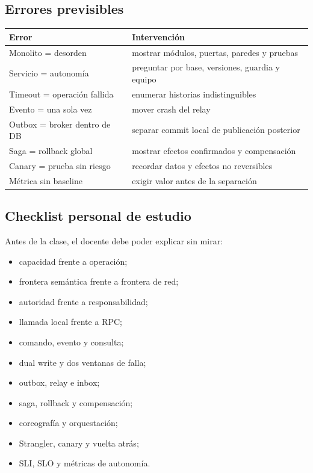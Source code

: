 \documentclass[variant=docente,cover=institutional,mode=screen]{ua-engineering-v6-article}
\begin{document}
\subsection{Errores previsibles}
\begin{center}
\begin{tabular}{p{}p{}}
\toprule
\textbf{Error} & \textbf{Intervención} \\
\midrule
Monolito = desorden & mostrar módulos, puertas, paredes y pruebas \\
Servicio = autonomía & preguntar por base, versiones, guardia y equipo \\
Timeout = operación fallida & enumerar historias indistinguibles \\
Evento = una sola vez & mover crash del relay \\
Outbox = broker dentro de DB & separar commit local de publicación posterior \\
Saga = rollback global & mostrar efectos confirmados y compensación \\
Canary = prueba sin riesgo & recordar datos y efectos no reversibles \\
Métrica sin baseline & exigir valor antes de la separación \\
\bottomrule
\end{tabular}
\end{center}

\subsection{Checklist personal de estudio}
Antes de la clase, el docente debe poder explicar sin mirar:
\begin{itemize}
\item capacidad frente a operación;
\item frontera semántica frente a frontera de red;
\item autoridad frente a responsabilidad;
\item llamada local frente a RPC;
\item comando, evento y consulta;
\item dual write y dos ventanas de falla;
\item outbox, relay e inbox;
\item saga, rollback y compensación;
\item coreografía y orquestación;
\item Strangler, canary y vuelta atrás;
\item SLI, SLO y métricas de autonomía.
\end{itemize}
\end{document}
